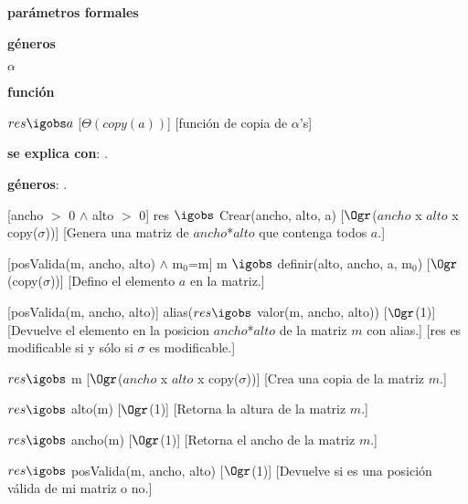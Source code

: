 \begin{Interfaz}

	\textbf{parámetros formales}\parindent\\
	\parbox{1.7cm}{\textbf{géneros}} $\alpha$\\	\parbox[t]{1.7cm}{\textbf{función}}\parbox[t]{\textwidth-2\parindent-1.7cm}{%
	{$res \igobs a$}
	[$\Theta(copy(a))$]
	[función de copia de $\alpha$'s]
	}

	\textbf{se explica con}: .

	\textbf{géneros}: .


	[ancho $>$ 0 $\land$ alto $>$ 0]
	{res $\igobs$ Crear(ancho, alto, a)}
	[$\Ogr$($ancho$ x $alto$ x copy($\sigma$))]
	[Genera una matriz de $ancho$*$alto$ que contenga todos $a$.]

	[posValida(m, ancho, alto) $\land$ m$_0$=m]
	{m $\igobs$ definir(alto, ancho, a, m$_0$)}
	[$\Ogr$(copy($\sigma$))]
	[Defino el elemento $a$ en la matriz.]
	
	[posValida(m, ancho, alto)]
	{alias($res \igobs$ valor(m, ancho, alto))}
	[$\Ogr$(1)]
	[Devuelve el elemento en la posicion $ancho$*$alto$ de la matriz $m$ con alias.]
	[res es modificable si y sólo si $\sigma$ es modificable.]

	{$res \igobs$ m}  
	[$\Ogr$($ancho$ x $alto$ x copy($\sigma$))]
	[Crea una copia de la matriz $m$.]

	{$res \igobs$ alto(m)}  
	[$\Ogr$(1)]
	[Retorna la altura de la matriz $m$.]

	{$res \igobs$ ancho(m)}  
	[$\Ogr$(1)]
	[Retorna el ancho de la matriz $m$.]

	{$res \igobs$ posValida(m, ancho, alto)}  
	[$\Ogr$(1)]
	[Devuelve si es una posición válida de mi matriz o no.]
	
\end{Interfaz}

